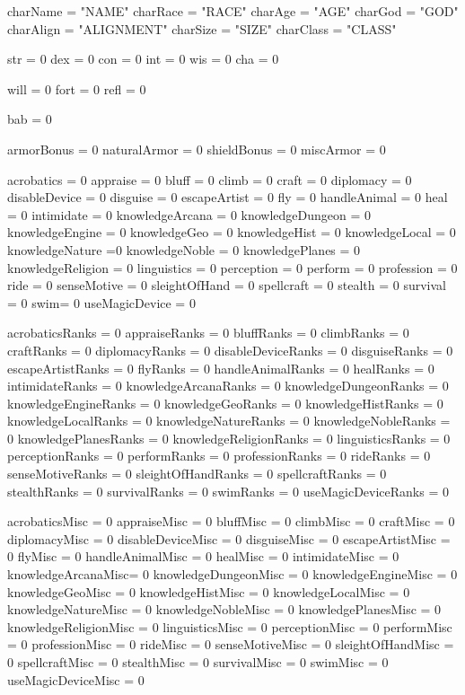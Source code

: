 \begin{python}

charName = "NAME"
charRace = "RACE"
charAge = "AGE"
charGod = "GOD"
charAlign = "ALIGNMENT"
charSize = "SIZE"
charClass = "CLASS"
	
str = 0
dex = 0
con = 0
int = 0
wis = 0
cha = 0

will = 0
fort = 0
refl = 0

bab = 0

armorBonus = 0
naturalArmor = 0
shieldBonus = 0
miscArmor = 0


acrobatics = 0
appraise = 0
bluff = 0
climb = 0
craft = 0
diplomacy = 0
disableDevice = 0
disguise = 0
escapeArtist = 0
fly = 0
handleAnimal = 0
heal = 0
intimidate = 0
knowledgeArcana = 0
knowledgeDungeon = 0
knowledgeEngine = 0
knowledgeGeo = 0
knowledgeHist = 0
knowledgeLocal = 0
knowledgeNature =0
knowledgeNoble = 0
knowledgePlanes = 0
knowledgeReligion = 0
linguistics = 0
perception = 0
perform = 0
profession = 0
ride = 0
senseMotive = 0
sleightOfHand = 0
spellcraft = 0
stealth = 0
survival = 0
swim= 0
useMagicDevice = 0

acrobaticsRanks = 0
appraiseRanks = 0
bluffRanks = 0
climbRanks = 0
craftRanks = 0
diplomacyRanks = 0
disableDeviceRanks = 0
disguiseRanks = 0
escapeArtistRanks = 0
flyRanks = 0
handleAnimalRanks = 0
healRanks = 0
intimidateRanks = 0
knowledgeArcanaRanks = 0
knowledgeDungeonRanks = 0
knowledgeEngineRanks = 0
knowledgeGeoRanks = 0
knowledgeHistRanks = 0
knowledgeLocalRanks = 0
knowledgeNatureRanks = 0
knowledgeNobleRanks = 0
knowledgePlanesRanks = 0
knowledgeReligionRanks = 0
linguisticsRanks = 0
perceptionRanks = 0
performRanks = 0
professionRanks = 0
rideRanks = 0
senseMotiveRanks = 0
sleightOfHandRanks = 0
spellcraftRanks = 0
stealthRanks = 0
survivalRanks = 0
swimRanks = 0
useMagicDeviceRanks = 0

acrobaticsMisc = 0
appraiseMisc = 0
bluffMisc = 0 
climbMisc = 0 
craftMisc = 0 
diplomacyMisc = 0 
disableDeviceMisc = 0
disguiseMisc = 0 
escapeArtistMisc = 0
flyMisc = 0
handleAnimalMisc = 0
healMisc = 0
intimidateMisc = 0
knowledgeArcanaMisc= 0
knowledgeDungeonMisc = 0
knowledgeEngineMisc = 0
knowledgeGeoMisc = 0
knowledgeHistMisc = 0
knowledgeLocalMisc = 0
knowledgeNatureMisc = 0
knowledgeNobleMisc = 0
knowledgePlanesMisc = 0 
knowledgeReligionMisc = 0
linguisticsMisc = 0
perceptionMisc = 0
performMisc = 0
professionMisc = 0
rideMisc = 0
senseMotiveMisc = 0 
sleightOfHandMisc = 0
spellcraftMisc = 0
stealthMisc = 0
survivalMisc = 0
swimMisc = 0
useMagicDeviceMisc = 0



\end{python}
